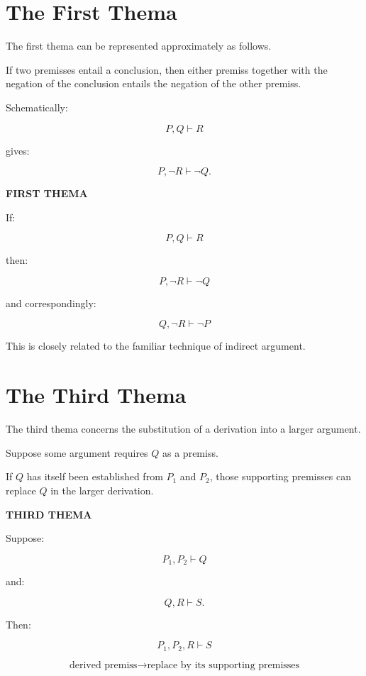 \documentclass[11pt]{article}
\begin{document}
\section{The First Thema}

The first thema can be represented approximately as follows.

If two premisses entail a conclusion, then either premiss together
with the negation of the conclusion entails the negation of the
other premiss.

Schematically:

\[
P,Q\vdash R
\]

gives:

\[
P,\neg R\vdash\neg Q.
\]

\begin{whiteboard}
\textbf{FIRST THEMA}

If:

\[
P,Q\vdash R
\]

then:

\[
\boxed{
P,\neg R\vdash\neg Q
}
\]

and correspondingly:

\[
Q,\neg R\vdash\neg P
\]
\end{whiteboard}

This is closely related to the familiar technique of indirect
argument.

\section{The Third Thema}

The third thema concerns the substitution of a derivation into a
larger argument.

Suppose some argument requires \(Q\) as a premiss.

If \(Q\) has itself been established from \(P_1\) and \(P_2\),
those supporting premisses can replace \(Q\) in the larger
derivation.

\begin{whiteboard}
\textbf{THIRD THEMA}

Suppose:

\[
P_1,P_2\vdash Q
\]

and:

\[
Q,R\vdash S.
\]

Then:

\[
\boxed{
P_1,P_2,R\vdash S
}
\]

\[
\text{derived premiss}
\rightarrow
\text{replace by its supporting premisses}
\]
\end{whiteboard}
\end{document}
